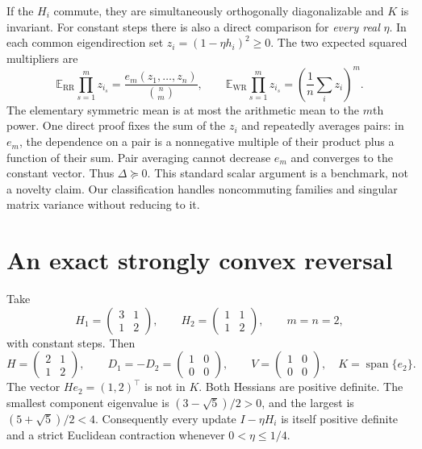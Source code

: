 \documentclass[11pt,letterpaper]{article}
\numberwithin{equation}{section}
\theoremstyle{definition}
\newcommand{\E}{\mathbb E}
\newcommand{\WR}{\mathrm{WR}}
\newcommand{\RR}{\mathrm{RR}}
\begin{document}
If the $H_i$ commute, they are simultaneously orthogonally diagonalizable and $K$ is invariant. For constant steps there is also a direct comparison for \emph{every real} $\eta$. In each common eigendirection set $z_i=(1-\eta h_i)^2\ge0$. The two expected squared multipliers are
\[
 \E_{\RR}\prod_{s=1}^m z_{i_s}=\frac{e_m(z_1,\ldots,z_n)}{\binom nm},
 \qquad
 \E_{\WR}\prod_{s=1}^m z_{i_s}=
 \left(\frac1n\sum_i z_i\right)^m.
\]
The elementary symmetric mean is at most the arithmetic mean to the $m$th power. One direct proof fixes the sum of the $z_i$ and repeatedly averages pairs: in $e_m$, the dependence on a pair is a nonnegative multiple of their product plus a function of their sum. Pair averaging cannot decrease $e_m$ and converges to the constant vector. Thus $\Delta\succeq0$. This standard scalar argument is a benchmark, not a novelty claim. Our classification handles noncommuting families and singular matrix variance without reducing to it.

\section{An exact strongly convex reversal}
\label{sec:example}

Take
\begin{equation}\label{eq:exampleH}
 H_1=\begin{pmatrix}3&1\\1&2\end{pmatrix},\qquad
 H_2=\begin{pmatrix}1&1\\1&2\end{pmatrix},\qquad m=n=2,
\end{equation}
with constant steps. Then
\[
 H=\begin{pmatrix}2&1\\1&2\end{pmatrix},\qquad
 D_1=-D_2=\begin{pmatrix}1&0\\0&0\end{pmatrix},\qquad
 V=\begin{pmatrix}1&0\\0&0\end{pmatrix},\quad K=\operatorname{span}\{e_2\}.
\]
The vector $He_2=(1,2)^\top$ is not in $K$. Both Hessians are positive definite. The smallest component eigenvalue is $(3-\sqrt5)/2>0$, and the largest is $(5+\sqrt5)/2<4$. Consequently every update $I-\eta H_i$ is itself positive definite and a strict Euclidean contraction whenever $0<\eta\le1/4$.
\end{document}

